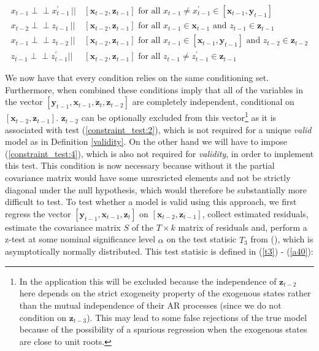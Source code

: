 \documentclass{article}
\def\indep{\perp \!\!\! \perp}
\begin{document}
\begin{align}
  x_{t-1} \indep x^{\prime}_{t-1} \,||\,& [\mathbf{x}_{t-2},\mathbf{z}_{t-1}] \text{ for all } x_{t-1} \neq x^{\prime}_{t-1} \in [\mathbf{x}_{t-1}, \mathbf{y}_{t-1}] \label{mod_constraint_test:1} \\
  x_{t-2} \indep z_{t-1} \,||\,& [\mathbf{x}_{t-2},\mathbf{z}_{t-1}] \text{ for all } x_{t-1} \in \mathbf{x}_{t-1} \text{ and } z_{t-1} \in \mathbf{z}_{t-1} \label{mod_constraint_test:3} \\
  x_{t-1} \indep z_{t-2} \,||\,& [\mathbf{x}_{t-2},\mathbf{z}_{t-1}] \text{ for all } x_{t-1} \in [\mathbf{x}_{t-1}, \mathbf{y}_{t-1}] \text{ and } z_{t-2} \in \mathbf{z}_{t-2} \label{mod_constraint_test:2} \\
  z_{t-1} \indep z^{\prime}_{t-1} || & [\mathbf{x}_{t-2},\mathbf{z}_{t-1}] \text{ for all } z_{t-1} \not = z^{\prime}_{t-1} \in \mathbf{z}_{t-1} \label{mod_constraint_test:4}
\end{align}

We now have that every condition relies on the same conditioning set. Furthermore, when combined these conditions imply that all of the variables in the vector $[\mathbf{y}_{t-1}, \mathbf{x}_{t-1}, \mathbf{z}_{t}, \mathbf{z}_{t-2}]$ are completely independent, conditional on $[\mathbf{x}_{t-2}, \mathbf{z}_{t-1}]$. $\mathbf{z}_{t-2}$ can be optionally excluded from this vector\footnote{In the application this will be excluded because the independence of $\mathbf{z}_{t-2}$ here depends on the strict exogeneity property of the exogenous states rather than the mutual independence of their AR processes (since we do not condition on $\mathbf{z}_{t-3}$). This may lead to some false rejections of the true model because of the possibility of a spurious regression when the exogenous states are close to unit roots.} as it is associated with test (\ref{constraint_test:2}), which is not required for a unique \textit{valid} model as in Definition \ref{validity}. On the other hand we will have to impose (\ref{constraint_test:4}), which is also not required for \textit{validity}, in order to implement this test. This condition is now necessary because without it the partial covariance matrix would have some unresricted elements and not be strictly diagonal under the null hypothesis, which would therefore be substantially more difficult to test. To test whether a model is valid using this approach, we first regress the vector $[\mathbf{y}_{t-1}, \mathbf{x}_{t-1}, \mathbf{z}_{t}]$ on $[\mathbf{x}_{t-2}, \mathbf{z}_{t-1}]$, collect estimated residuals, estimate the covariance matrix $S$ of the $T \times k$ matrix of residuals and, perform a z-test at some nominal significance level $\alpha$ on the test statisic $\hat{T}_3$ from \citeauthor{srivastava2005some} (\citeyear{srivastava2005some}), which is asymptotically normally distributed. This test statisic is defined in (\ref{t3}) - (\ref{a40}):
\end{document}
